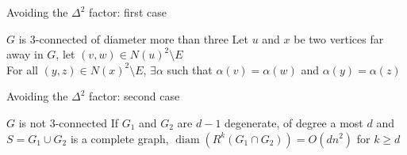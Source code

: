 \documentclass[11pt,xcolor=dvipsnames,presentation]{beamer}
\DeclareMathOperator{\diam}{diam}
\begin{document}
\begin{frame}{Avoiding the $\Delta^2$ factor: first case}
  \begin{block}{$G$ is 3-connected of diameter more than three}
  Let $u$ and $x$ be two vertices far away in $G$, let $(v,w)\in N(u)^2 \setminus E$\\
  For all $(y,z) \in N(x)^2 \setminus E$, $\exists \alpha$ such that $\alpha(v) =
  \alpha(w)$ and $\alpha(y) = \alpha(z)$
  \end{block}

  \vspace{7cm}
\end{frame}

\begin{frame}{Avoiding the $\Delta^2$ factor: second case}
  \begin{block}{$G$ is not 3-connected}
    If $G_1$ and $G_2$ are $d-1$ degenerate, of degree a most $d$ and $S = G_1
    \cup G_2$ is a complete graph, $\diam(R^k(G_1 \cap G_2)) = O(dn^2)$ for $k
    \ge d$
  \end{block}

  \vspace{7cm}
\end{frame}
\end{document}
